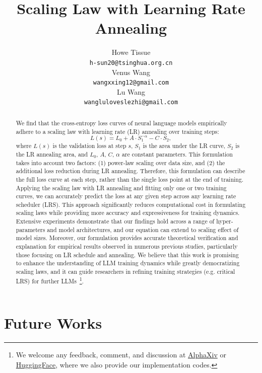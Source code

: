 \documentclass{article} %
\title{Scaling Law with Learning Rate Annealing}
\author{Howe Tissue \small{\Letter}\\ 
\texttt{h-sun20@tsinghua.org.cn} \\
\And 
Venus Wang \\
\texttt{wangxxing12@gmail.com} \\
\And 
Lu Wang \\
\texttt{wangluloveslezhi@gmail.com} \\
}
\begin{document}
\maketitle

\begin{abstract}
We find that the cross-entropy loss curves of neural language models empirically adhere to a scaling law with learning rate (LR) annealing over training steps:
$$L(s) = L_0 + A\cdot S_1^{-\alpha} - C\cdot S_2,$$
where $L(s)$ is the validation loss at step $s$, $S_1$ is the area under the LR curve, $S_2$ is the LR annealing area, and $L_0$, $A$, $C$, $\alpha$ are constant parameters.
This formulation takes into account two factors: (1) power-law scaling over data size, and (2) the additional loss reduction during LR annealing. 
Therefore, this formulation can describe the full loss curve at each step, rather than the single loss point at the end of training.
Applying the scaling law with LR annealing and fitting only one or two training curves, we can accurately predict the loss at any given step across any learning rate scheduler (LRS).
This approach significantly reduces computational cost in formulating scaling laws while providing more accuracy and expressiveness for training dynamics.
Extensive experiments demonstrate that our findings hold across a range of hyper-parameters and model architectures, and our equation can extend to scaling effect of model sizes.
Moreover, our formulation provides accurate theoretical verification and explanation for empirical results observed in numerous previous studies, particularly those focusing on LR schedule and annealing.
We believe that this work is promising to enhance the understanding of LLM training dynamics while greatly democratizing scaling laws, and it can guide researchers in refining training strategies (e.g. critical LRS) for further LLMs~\footnote{We welcome any feedback, comment, and discussion at \href{https://www.alphaxiv.org/abs/2408.11029}{AlphaXiv} or \href{https://huggingface.co/papers/2408.11029}{HuggingFace}, where we also provide our implementation codes.}.

\end{abstract}









\section{Future Works}
\end{document}
